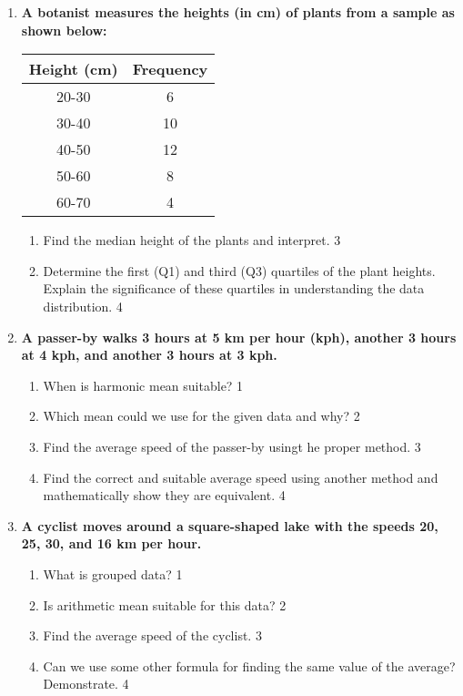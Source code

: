 \documentclass[a4paper,oneside]{book}
\begin{document}
\begin{enumerate}
\item
\textbf{A botanist measures the heights (in cm) of plants from a sample as shown below:}

\begin{table}[h]
\centering
\begin{tabular}{c|c}
\textbf{Height (cm)} & \textbf{Frequency} \\ \hline
20-30                & 6                  \\ \hline
30-40                & 10                 \\ \hline
40-50                & 12                 \\ \hline
50-60                & 8                  \\ \hline
60-70                & 4                  
\end{tabular}
\end{table}

\begin{enumerate}
    \item  
    Find the median height of the plants and interpret. \hfill 3
    \item
    Determine the first (Q1) and third (Q3) quartiles of the plant heights. Explain the significance of these quartiles in understanding the data distribution. \hfill 4
\end{enumerate}

  
   \item
	  \textbf{A passer-by walks 3 hours at 5 km per hour (kph), another 3 hours 
	  at 4 kph, and another 3 hours at 3 kph.} 
  
  \begin{enumerate}
    \item
	When is harmonic mean suitable? \hfill 1
    \item
	Which mean could we use for the given data and why? \hfill 2
    \item  
	Find the average speed of the passer-by usingt he proper method. \hfill 3
    \item
	Find the correct and suitable average speed using another method and mathematically show they are equivalent. \hfill 4
  \end{enumerate}

 \item
	  \textbf{A cyclist moves around a square-shaped lake with the speeds 20, 25, 30, and 16 km per hour.} 
  
  \begin{enumerate}
    \item
	What is grouped data? \hfill 1
    \item
	Is arithmetic mean suitable for this data? \hfill 2
    \item  
	Find the average speed of the cyclist. \hfill 3
    \item
	Can we use some other formula for finding the same value of the average? Demonstrate. \hfill 4
  \end{enumerate}
  

\end{enumerate}
\end{document}

